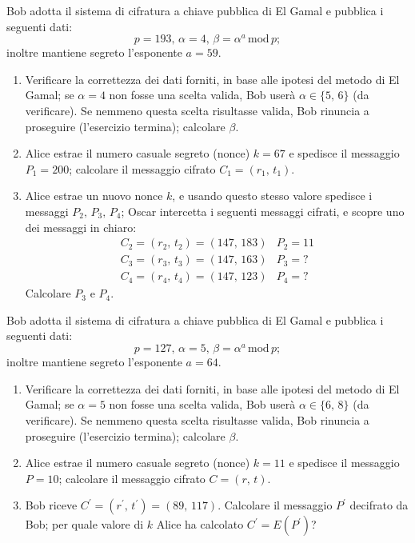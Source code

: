         Bob adotta il sistema di cifratura a chiave pubblica di El Gamal e pubblica i seguenti dati: \[
            p=193,\, \alpha=4,\, \beta= \alpha^{a} \,\mathrm{mod}\, p
        ;\] inoltre mantiene segreto l'esponente $a=59$.
        \begin{enumerate}
            \item Verificare la correttezza dei dati forniti, in base alle ipotesi del metodo di 
                El Gamal; se $\alpha=4$ non fosse una scelta valida, Bob userà $\alpha\in\{5,\,6\}$ 
                (da verificare). Se nemmeno questa scelta risultasse valida, Bob rinuncia a proseguire 
                (l'esercizio termina); calcolare $\beta$.
            \item Alice estrae il numero casuale segreto (nonce) $k=67$ e spedisce il messaggio $P_1=200$; 
                calcolare il messaggio cifrato $C_1=(r_1,\,t_1)$.
            \item Alice estrae un nuovo nonce $k$, e usando questo stesso valore spedisce i messaggi 
                $P_2,\,P_3,\,P_4$; Oscar intercetta i seguenti messaggi cifrati, e scopre uno dei messaggi 
                in chiaro: \[
                \begin{array}{ll}
                    C_2=(r_2,\,t_2)=(147,\,183) & P_2=11\\
                    C_3=(r_3,\,t_3)=(147,\,163) & P_3=?\\
                    C_4=(r_4,\,t_4)=(147,\,123) & P_4=?
                \end{array}
                \] Calcolare $P_3$ e $P_4$.
        \end{enumerate}

        Bob adotta il sistema di cifratura a chiave pubblica di El Gamal e pubblica i seguenti dati: \[
            p=127,\, \alpha=5,\, \beta= \alpha^{a} \,\mathrm{mod}\, p
        ;\] inoltre mantiene segreto l'esponente $a=64$.
        \begin{enumerate}
            \item Verificare la correttezza dei dati forniti, in base alle ipotesi del metodo di 
                El Gamal; se $\alpha=5$ non fosse una scelta valida, Bob userà $\alpha\in\{6,\,8\}$ 
                (da verificare). Se nemmeno questa scelta risultasse valida, Bob rinuncia a proseguire 
                (l'esercizio termina); calcolare $\beta$.
            \item Alice estrae il numero casuale segreto (nonce) $k=11$ e spedisce il messaggio $P=10$; 
                calcolare il messaggio cifrato $C=(r,\,t)$.
            \item Bob riceve $C^{\prime}=(r^{\prime},\,t^{\prime})=(89,\,117)$. Calcolare il messaggio $P^{\prime}$ 
                decifrato da Bob; per quale valore di $k$ Alice ha calcolato $C^{\prime}=E(P^{\prime})$?
        \end{enumerate}

